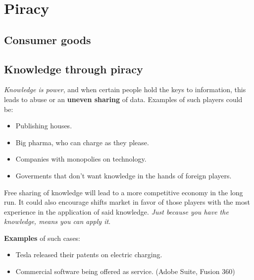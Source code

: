 
\section{Piracy} 


\subsection{Consumer goods} 


\subsection{Knowledge through piracy} 

\textit{Knowledge is power}, and when certain people hold the keys to information, this leads to abuse or an \textbf{uneven sharing} of data.
Examples of such players could be:
\begin{itemize}
	\item Publishing houses.
	\item Big pharma, who can charge as they please.
	\item Companies with monopolies on technology.
	\item Goverments that don't want knowledge in the hands of foreign players.
\end{itemize}

Free sharing of knowledge will lead to a more competitive economy in the long run. It could also encourage shifts market in favor of those players with the most experience in the application of said knowledge. 
\textit{Just because you have the knowledge, means you can apply it}.

\textbf{Examples} of such cases:
\begin{itemize}
	\item Tesla released their patents on electric charging.
	\item Commercial software being offered as service. (Adobe Suite, Fusion 360)
\end{itemize}



